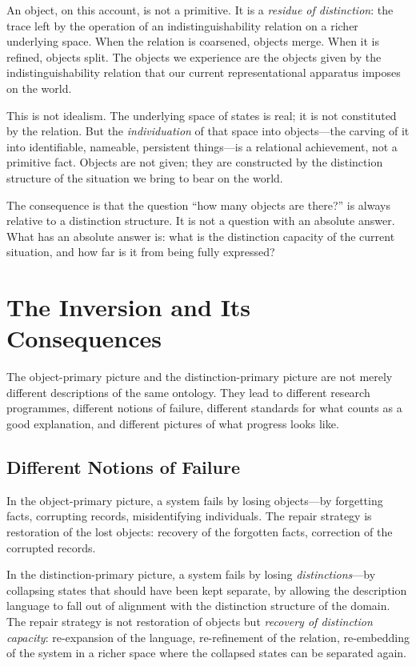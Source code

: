 \documentclass[12pt, letterpaper]{article}
\theoremstyle{remark}
\begin{document}
An object, on this account, is not a primitive.  It is a \emph{residue of
distinction}: the trace left by the operation of an indistinguishability
relation on a richer underlying space.  When the relation is coarsened,
objects merge.  When it is refined, objects split.  The objects we
experience are the objects given by the indistinguishability relation
that our current representational apparatus imposes on the world.

This is not idealism.  The underlying space of states is real; it is not
constituted by the relation.  But the \emph{individuation} of that space
into objects---the carving of it into identifiable, nameable, persistent
things---is a relational achievement, not a primitive fact.  Objects
are not given; they are constructed by the distinction structure of the
situation we bring to bear on the world.

The consequence is that the question ``how many objects are there?'' is
always relative to a distinction structure.  It is not a question with
an absolute answer.  What has an absolute answer is: what is the
distinction capacity of the current situation, and how far is it
from being fully expressed?

\section{The Inversion and Its Consequences}

The object-primary picture and the distinction-primary picture are not
merely different descriptions of the same ontology.  They lead to different
research programmes, different notions of failure, different standards for
what counts as a good explanation, and different pictures of what progress
looks like.

\subsection{Different Notions of Failure}

In the object-primary picture, a system fails by losing objects---by
forgetting facts, corrupting records, misidentifying individuals.  The
repair strategy is restoration of the lost objects: recovery of the
forgotten facts, correction of the corrupted records.

In the distinction-primary picture, a system fails by losing
\emph{distinctions}---by collapsing states that should have been kept
separate, by allowing the description language to fall out of alignment
with the distinction structure of the domain.  The repair strategy is
not restoration of objects but \emph{recovery of distinction capacity}:
re-expansion of the language, re-refinement of the relation, re-embedding
of the system in a richer space where the collapsed states can be separated
again.
\end{document}

